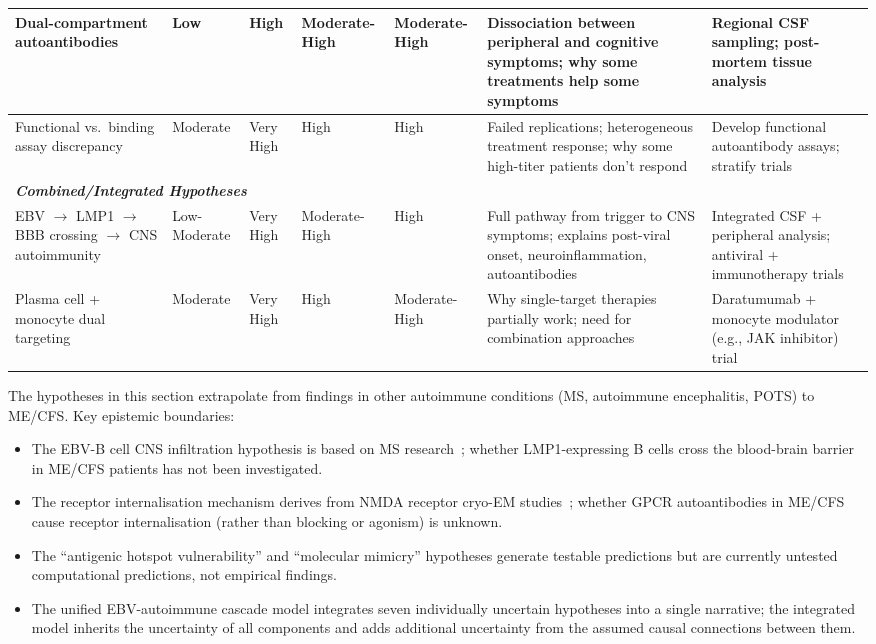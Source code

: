 \begin{landscape}
\begin{longtable}{p{3.5cm}p{2cm}p{2cm}p{1.8cm}p{1.8cm}p{4.5cm}p{5cm}}
\midrule
Dual-compartment autoantibodies & Low & High & Moderate-High & Moderate-High & Dissociation between peripheral and cognitive symptoms; why some treatments help some symptoms & Regional CSF sampling; post-mortem tissue analysis \\
\midrule
Functional vs.\ binding assay discrepancy & Moderate & Very High & High & High & Failed replications; heterogeneous treatment response; why some high-titer patients don't respond & Develop functional autoantibody assays; stratify trials \\
\midrule
\multicolumn{7}{l}{\textit{\textbf{Combined/Integrated Hypotheses}}} \\
\midrule
EBV $\rightarrow$ LMP1 $\rightarrow$ BBB crossing $\rightarrow$ CNS autoimmunity & Low-Moderate & Very High & Moderate-High & High & Full pathway from trigger to CNS symptoms; explains post-viral onset, neuroinflammation, autoantibodies & Integrated CSF + peripheral analysis; antiviral + immunotherapy trials \\
\midrule
Plasma cell + monocyte dual targeting & Moderate & Very High & High & Moderate-High & Why single-target therapies partially work; need for combination approaches & Daratumumab + monocyte modulator (e.g., JAK inhibitor) trial \\
\end{longtable}
\normalsize
\end{landscape}

\begin{limitation}
The hypotheses in this section extrapolate from findings in other autoimmune conditions (MS, autoimmune encephalitis, POTS) to ME/CFS. Key epistemic boundaries:
\begin{itemize}
    \item The EBV-B cell CNS infiltration hypothesis is based on MS research~\cite{Pless2026ebv_demyelination}; whether LMP1-expressing B cells cross the blood-brain barrier in ME/CFS patients has not been investigated.
    \item The receptor internalisation mechanism derives from NMDA receptor cryo-EM studies~\cite{Kim2026nmdar_cryoem}; whether GPCR autoantibodies in ME/CFS cause receptor internalisation (rather than blocking or agonism) is unknown.
    \item The ``antigenic hotspot vulnerability'' and ``molecular mimicry'' hypotheses generate testable predictions but are currently untested computational predictions, not empirical findings.
    \item The unified EBV-autoimmune cascade model integrates seven individually uncertain hypotheses into a single narrative; the integrated model inherits the uncertainty of all components and adds additional uncertainty from the assumed causal connections between them.
\end{itemize}
\end{limitation}

